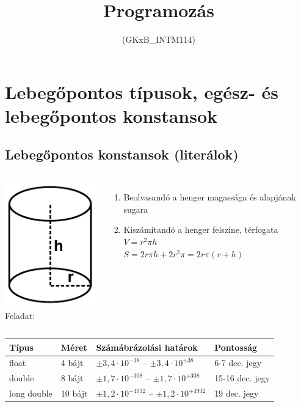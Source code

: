 \documentclass[usenames,dvipsnames,aspectratio=169]{beamer}
\title[4. előadás]{Programozás}
\subtitle{(GKxB\_INTM114)}
\begin{document}
\begin{frame}[plain]
  \titlepage
  \logoalul
\end{frame}

\section{Lebegőpontos típusok, egész- és lebegőpontos konstansok}
\subsection{Lebegőpontos konstansok (literálok)}
\begin{frame}
  \begin{columns}[c]
      \hfill \includegraphics{henger.pdf}\\
      Feladat:
      \begin{enumerate}
        \item Beolvasandó a henger magassága és alapjának sugara
        \item Kiszámítandó a henger felszíne, térfogata\\
          $V = r^2\pi h$\\
          $S = 2r\pi h + 2r^2\pi = 2r\pi(r+h)$\\
      \end{enumerate}
      \vfill
  \end{columns}
  \begin{center}
    \begin{tabular}{llll}
      Típus & Méret & Számábrázolási határok & Pontosság\\ \hline \noalign{\smallskip}
      float & 4 bájt & $\pm3,4\cdot10^{-38}$ -- $\pm3,4\cdot10^{+38}$ & 6-7 dec. jegy\\
      double & 8 bájt & $\pm1,7\cdot10^{-308}$ -- $\pm1,7\cdot10^{+308}$ & 15-16 dec. jegy\\
      long double & 10 bájt & $\pm1,2\cdot10^{-4932}$ -- $\pm1,2\cdot10^{+4932}$ & 19 dec. jegy
    \end{tabular}
  \end{center}
\end{frame}
\end{document}
